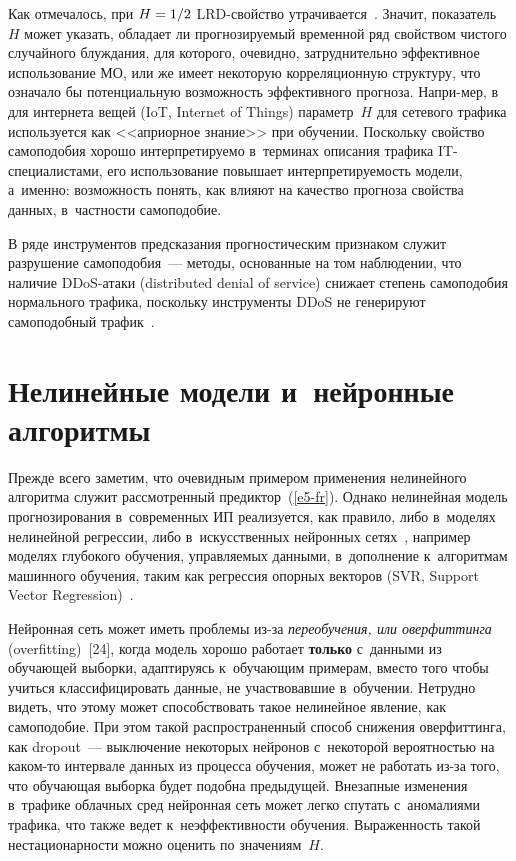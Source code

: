 \begin{multicols}{2}
  Как отмечалось, при $H\hm=1/2$ LRD-свой\-ст\-во 
 утрачивается~\cite{20-fr}. Значит, показатель~$H$ может указать, обладает 
ли прогнозируемый временной ряд свойством чистого случайного 
блуждания, для которого, очевидно, затруднительно эффективное 
использование МО, или же имеет некоторую корреляционную структуру, 
что означало бы потенциальную возможность эффективного прогноза. 
Напри-\linebreak мер, в~\cite{22-fr} для интернета вещей (IoT, Internet of Things) параметр~$H$ для 
сетевого трафика используется как <<априорное знание>> при обуче\-нии. 
\mbox{Поскольку} свойство самоподобия хорошо интерпретируемо в~терминах 
описания трафика IT-спе\-ци\-а\-ли\-ста\-ми, его использование повышает 
ин\-тер\-пре\-ти\-ру\-емость модели, а~именно: воз\-мож\-ность \mbox{понять}, как влияют на 
качество прогноза свойства данных, в~част\-ности самоподобие. 
  
  В ряде инструментов предсказания прогностическим признаком служит 
разрушение самоподобия~--- методы, основанные на том наблюдении, что 
наличие DDoS-ата\-ки (distributed denial of service) снижает степень самоподобия нормального трафика, 
поскольку инструменты DDoS не генерируют самоподобный 
трафик~\cite{14-fr}. 


\section{Нелинейные модели и~нейронные алгоритмы}


  Прежде всего заметим, что очевидным примером применения 
нелинейного алгоритма служит рассмотренный предиктор~(\ref{e5-fr}). 
Однако нелинейная модель прогнозирования в~современных ИП\linebreak 
реализуется, как правило, либо в~моделях нелинейной регрессии, либо 
в~искусственных нейронных сетях~\cite{1-fr, 23-fr, 24-fr}, например моделях 
глубокого обуче\-ния, управ\-ля\-емых данными, в~\mbox{дополнение} к~алгоритмам 
машинного обуче\-ния, таким как регрессия опорных векторов (SVR, Support 
Vector Regression)~\cite{10-fr, 24-fr}. 
  
   Нейронная сеть может иметь проблемы из-за \textit{переобучения, или 
оверфиттинга} (overfitting)~[24], когда модель хорошо работает 
\textbf{только} с~данными из обучающей выборки, адаптируясь  
к~обуча\-ющим примерам, вместо того чтобы учиться классифицировать 
данные, не участвовавшие в~обучении. Нетрудно видеть, что этому может 
способствовать такое нелинейное явление, как самоподобие. При этом такой 
распространенный способ снижения оверфиттинга, как dropout~--- 
выключение некоторых нейронов с~некоторой вероятностью на каком-то 
интервале данных из процесса обучения, может не работать из-за того, что 
обучающая выборка будет подобна предыдущей. Внезапные 
изменения~\cite{25-fr} в~трафике облачных сред нейронная сеть может 
легко спутать с~аномалиями трафика, что также ведет к~неэффективности 
обучения. Выраженность такой нестационарности можно оценить по 
значениям~$H$. 
  

\end{multicols}
